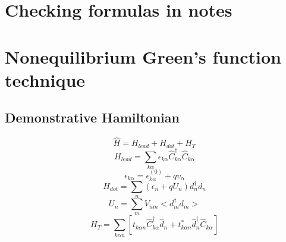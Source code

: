 \documentclass[11pt,a4paper]{article}
\begin{document}
\section{Checking formulas in notes}
% 
\section{Nonequilibrium Green's function technique}
\subsection{Demonstrative Hamiltonian}
\begin{equation}
\hat{H}=H_{l e a d}+H_{d o t}+H_{T}
\end{equation}
\begin{equation}
H_{l e a d}=\sum_{k \alpha} \epsilon_{k \alpha} \hat{C}_{k \alpha}^{\dagger} \hat{C}_{k \alpha}
\end{equation}
\begin{equation}
\epsilon_{k \alpha}=\epsilon_{k \alpha}^{(0)}+q v_{\alpha}
\end{equation}
\begin{equation}
H_{d o t}=\sum_{n}\left(\epsilon_{n}+q U_{n}\right) d_{n}^{\dagger} d_{n}
\end{equation}
\begin{equation}
U_{n}=\sum_{m} V_{n m}<d_{m}^{\dagger} d_{m}>
\end{equation}
\begin{equation}
H_{T}=\sum_{k \alpha n}\left[t_{k \alpha n} \hat{C}_{k \alpha}^{\dagger} \hat{d}_{n}+t_{k \alpha n}^{*} \hat{d}_{n}^{\dagger} \hat{C}_{k \alpha}\right]
\end{equation}
\end{document}
